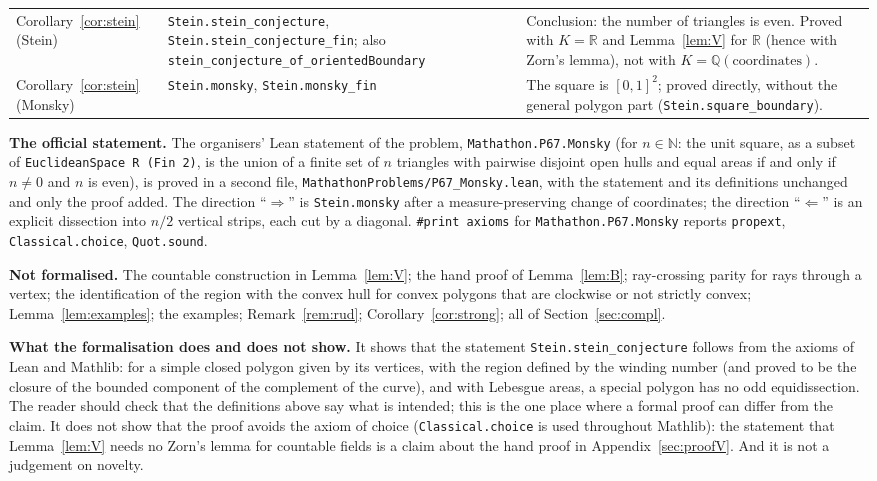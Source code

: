 \documentclass[11pt]{article}
\theoremstyle{definition}
\newcommand{\Q}{\mathbb{Q}}
\newcommand{\R}{\mathbb{R}}
\newcommand{\tL}[1]{\texttt{#1}}
\begin{document}
{\begin{longtable}{@{}>{\raggedright\arraybackslash}p{3.5cm}>{\raggedright\arraybackslash}p{4.6cm}>{\raggedright\arraybackslash}p{6.6cm}@{}}
Corollary~\ref{cor:stein} (Stein) & \tL{Stein.stein\_conjecture}, \tL{Stein.stein\_conjecture\_fin}; also \tL{stein\_conjecture\_\allowbreak of\_orientedBoundary} & Conclusion: the number of triangles is even. Proved with $K=\R$ and Lemma~\ref{lem:V} for $\R$ (hence with Zorn's lemma), not with $K=\Q(\text{coordinates})$.\\
Corollary~\ref{cor:stein} (Monsky) & \tL{Stein.monsky}, \tL{Stein.monsky\_fin} & The square is $[0,1]^2$; proved directly, without the general polygon part (\tL{Stein.square\_boundary}).\\
\end{longtable}}

\textbf{The official statement.} The organisers' Lean statement of the problem, \tL{Mathathon.P67.Monsky} (for $n\in\mathbb N$: the unit square, as a subset of \tL{EuclideanSpace R (Fin 2)}, is the union of a finite set of $n$ triangles with pairwise disjoint open hulls and equal areas if and only if $n\ne0$ and $n$ is even), is proved in a second file, \tL{MathathonProblems/P67\_Monsky.lean}, with the statement and its definitions unchanged and only the proof added. The direction ``$\Rightarrow$'' is \tL{Stein.monsky} after a measure-preserving change of coordinates; the direction ``$\Leftarrow$'' is an explicit dissection into $n/2$ vertical strips, each cut by a diagonal. \tL{\#print axioms} for \tL{Mathathon.P67.Monsky} reports \tL{propext}, \tL{Classical.choice}, \tL{Quot.sound}.

\textbf{Not formalised.} The countable construction in Lemma~\ref{lem:V}; the hand proof of
Lemma~\ref{lem:B}; ray-crossing parity for rays through a vertex; the identification of the region
with the convex hull for convex polygons that are clockwise or not strictly convex; Lemma~\ref{lem:examples}; the examples; Remark~\ref{rem:rud};
Corollary~\ref{cor:strong}; all of Section~\ref{sec:compl}.

\textbf{What the formalisation does and does not show.} It shows that the statement \tL{Stein.stein\_conjecture}
follows from the axioms of Lean and Mathlib: for a simple closed polygon given by its vertices, with
the region defined by the winding number (and proved to be the closure of the bounded component of
the complement of the curve), and with Lebesgue areas, a special polygon has no odd
equidissection. The reader should check that the definitions above say what is intended; this is
the one place where a formal proof can differ from the claim. It does not show that the proof
avoids the axiom of choice (\tL{Classical.choice} is used throughout Mathlib): the statement that
Lemma~\ref{lem:V} needs no Zorn's lemma for countable fields is a claim about the hand proof in
Appendix~\ref{sec:proofV}. And it is not a judgement on novelty.
\end{document}
